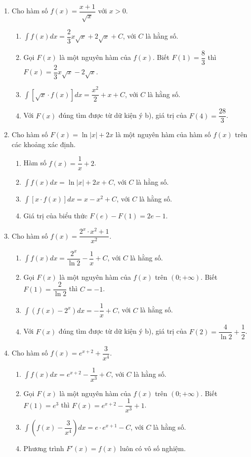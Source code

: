 \documentclass[12pt]{article}
\begin{document}
\begin{enumerate}[label=\textbf{Câu \arabic*.}, start=1]
		\item Cho hàm số $f(x) = \dfrac{x + 1}{\sqrt{x}}$ với $x > 0$.
		\begin{enumerate}[label=\alph*)]
			\item $\displaystyle \int f(x) dx = \dfrac{2}{3}x\sqrt{x} + 2\sqrt{x} + C$, với $C$ là hằng số.
			\item Gọi $F(x)$ là một nguyên hàm của $f(x)$. Biết $F(1) = \dfrac{8}{3}$ thì $F(x) = \dfrac{2}{3}x\sqrt{x} - 2\sqrt{x}$.
			\item $\displaystyle \int [\sqrt{x} \cdot f(x)] dx = \dfrac{x^2}{2} + x + C$, với $C$ là hằng số.
			\item Với $F(x)$ đúng tìm được từ dữ kiện ý b), giá trị của $F(4) = \dfrac{28}{3}$.
		\end{enumerate}
		
		\item Cho hàm số $F(x) = \ln|x| + 2x$ là một nguyên hàm của hàm số $f(x)$ trên các khoảng xác định.
		\begin{enumerate}[label=\alph*)]
			\item Hàm số $f(x) = \dfrac{1}{x} + 2$.
			\item $\displaystyle \int f(x) dx = \ln|x| + 2x + C$, với $C$ là hằng số.
			\item $\displaystyle \int [x \cdot f(x)] dx = x - x^2 + C$, với $C$ là hằng số.
			\item Giá trị của biểu thức $F(e) - F(1) = 2e - 1$.
		\end{enumerate}
		
		\item Cho hàm số $f(x) = \dfrac{2^x \cdot x^2 + 1}{x^2}$.
		\begin{enumerate}[label=\alph*)]
			\item $\displaystyle \int f(x) dx = \dfrac{2^x}{\ln 2} - \dfrac{1}{x} + C$, với $C$ là hằng số.
			\item Gọi $F(x)$ là một nguyên hàm của $f(x)$ trên $(0; +\infty)$. Biết $F(1) = \dfrac{2}{\ln 2}$ thì $C = -1$.
			\item $\displaystyle \int (f(x) - 2^x) dx = -\dfrac{1}{x} + C$, với $C$ là hằng số.
			\item Với $F(x)$ đúng tìm được từ dữ kiện ý b), giá trị của $F(2) = \dfrac{4}{\ln 2} + \dfrac{1}{2}$.
		\end{enumerate}
		
		\item Cho hàm số $f(x) = e^{x+2} + \dfrac{3}{x^4}$.
		\begin{enumerate}[label=\alph*)]
			\item $\displaystyle \int f(x) dx = e^{x+2} - \dfrac{1}{x^3} + C$, với $C$ là hằng số.
			\item Gọi $F(x)$ là một nguyên hàm của $f(x)$ trên $(0; +\infty)$. Biết $F(1) = e^3$ thì $F(x) = e^{x+2} - \dfrac{1}{x^3} + 1$.
			\item $\displaystyle \int \left( f(x) - \dfrac{3}{x^4} \right) dx = e \cdot e^{x+1} - C$, với $C$ là hằng số.
			\item Phương trình $F'(x) = f(x)$ luôn có vô số nghiệm.
		\end{enumerate}
		

\end{enumerate}
\end{document}
